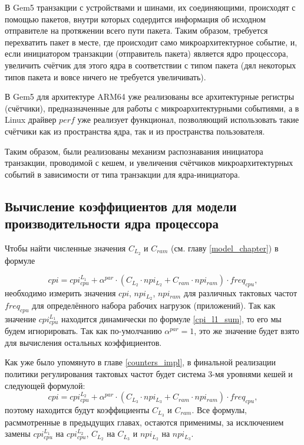     В Gem5 транзакции с устройствами и шинами, их соединяющими, происходят с помощью пакетов,
    внутри которых содердится информация об исходном отправителе на протяжении всего пути
    пакета. Таким образом, требуется перехватить пакет в месте, где происходит само микроархитектурное
    событие, и, если инициатором транзакции (отправитель пакета) является ядро процессора,
    увеличить счётчик для этого ядра в соответствии с типом пакета (дял некоторых типов пакета и вовсе
    ничего не требуется увеличивать).

    В Gem5 для архитектуре ARM64 уже реализованы все архитектурные регистры (счётчики), предназначенные
    для работы с микроархитектурными событиями, а в Linux драйвер $perf$ уже реализует функционал,
    позволяющий использовать такие счётчики как из пространства ядра, так и из пространства пользователя.

    Таким образом, были реализованы механизм распознавания инициатора транзакции, проводимой
    с кешем, и увеличения счётчиков микроархитектурных событий в зависимости от типа транзакции
    для ядра-инициатора.

\subsection{Вычисление коэффициентов для модели производительности ядра процессора} \label{model_coeffs}

    Чтобы найти численные значения $C_{L_2}$ и $C_{ram}$ (см. главу \ref{model_chapter}) в формуле

    \begin{equation*}
        cpi = cpi_{cpu}^{L_1} + \alpha^{par} \cdot
        \left( C_{L_2} \cdot npi_{L_2} + C_{ram} \cdot npi_{ram} \right) \cdot freq_{cpu},
    \end{equation*}
    необходимо измерить значения $cpi$, $npi_{L_2}$, $npi_{ram}$ для различных тактовых частот
    $freq_{cpu}$ для определённого набора рабочих нагрузок (приложений). Так как значение $cpi_{cpu}^{L_1}$
    находится динамически по формуле \eqref{cpi_l1_sum}, то его мы будем игнорировать. Так как
    по-умолчанию $\alpha^{par} = 1$, это же значение будет взято для вычисления остальных коэффициентов.

    Как уже было упомянуто в главе \ref{counters_impl}, в финальной реализации политики регулирования тактовых
    частот будет система 3-мя уровнями кешей и следующей формулой:
    \begin{equation} \label{cpi_formula_3lvl}
        cpi = cpi_{cpu}^{L_2} + \alpha^{par} \cdot
        \left( C_{L_3} \cdot npi_{L_3} + C_{ram} \cdot npi_{ram} \right) \cdot freq_{cpu},
    \end{equation}
    поэтому находится будут коэффициенты $C_{L_3}$ и $C_{ram}$. Все формулы, расммотренные в предыдущих
    главах, остаются применимы, за исключением замены $cpi_{cpu}^{L_1}$ на $cpi_{cpu}^{L_2}$,
    $C_{L_2}$ на $C_{L_3}$ и $npi_{L_2}$ на $npi_{L_3}$.

